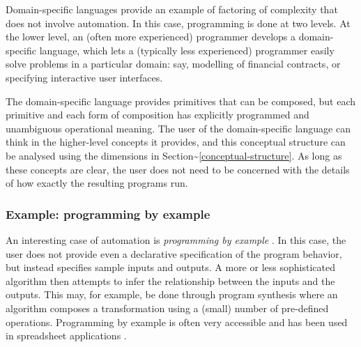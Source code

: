 \documentclass[english,submission]{programming}
\begin{document}
Domain-specific languages \cite{DSLs} provide an example of factoring of
complexity that does not involve automation. In this case, programming
is done at two levels. At the lower level, an (often more experienced)
programmer develops a domain-specific language, which lets a (typically
less experienced) programmer easily solve problems in a particular
domain: say, modelling of financial contracts, or specifying interactive
user interfaces.

The domain-specific language provides primitives that can be composed,
but each primitive and each form of composition has explicitly
programmed and unambiguous operational meaning. The user of the
domain-specific language can think in the higher-level concepts it
provides, and this conceptual structure can be analysed using the
dimensions in Section\textasciitilde{}\ref{conceptual-structure}. As
long as these concepts are clear, the user does not need to be concerned
with the details of how exactly the resulting programs run.

\hypertarget{example-programming-by-example}{%
\subsubsection{Example: programming by
example}\label{example-programming-by-example}}

An interesting case of automation is \emph{programming by example}
\cite{PBE}. In this case, the user does not provide even a declarative
specification of the program behavior, but instead specifies sample
inputs and outputs. A more or less sophisticated algorithm then attempts
to infer the relationship between the inputs and the outputs. This may,
for example, be done through program synthesis where an algorithm
composes a transformation using a (small) number of pre-defined
operations. Programming by example is often very accessible and has been
used in spreadsheet applications \cite{PBEExcel}.

\end{document}
